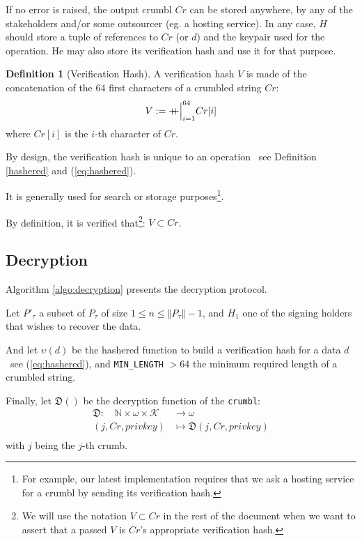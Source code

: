 \documentclass[twoside,twocolumn]{article}
\newcommand{\concat}{\mathbin{{+}\mspace{-8mu}{+}}}
\newcommand{\norm}[1]{\left\Vert#1\right\Vert}
\theoremstyle{definition}
\newtheorem{definition}{Definition}
\theoremstyle{remark}
\begin{document}
If no error is raised, the output crumbl $Cr$ can be stored anywhere, by any of the stakeholders and/or some outsourcer (eg. a hosting service). In any 
case, $H$ should store a tuple of references to $Cr$ (or $d$) and the keypair used for the operation. He may also store its verification hash and use 
it for that purpose.

\begin{definition}[Verification Hash]
    \label{verificationHash}
    A verification hash $V$ is made of the concatenation of the 64 first characters of a crumbled string $Cr$:
    \begin{equation}
        \label{eq:verificationHash}
        V := \concat {\Big|}_{i=1}^{64} Cr[i]
    \end{equation}
    where $Cr[i]$ is the $i$-th character of $Cr$.

    By design, the verification hash is unique to an operation \textemdash~see Definition \ref{hashered} and (\ref{eq:hashered}).

    It is generally used for search or storage purposes\footnote{For example, our latest implementation requires that we ask a hosting service for a 
    crumbl by sending its verification hash.}.

    By definition, it is verified that\footnote{We will use the notation $V \subset Cr$ in the rest of the document when we want to assert that a 
    passed $V$ is $Cr$'s appropriate verification hash.}: $V \subset Cr$.
\end{definition}

\subsection{Decryption}

Algorithm \ref{algo:decryption} presents the decryption protocol.

\vspace{1em} %

Let $P'_\tau$ a subset of $P_\tau$ of size $1 \leq n \leq \norm{P_\tau} - 1$, and $H_1$ one of the signing holders that wishes to recover the data.

And let $\upsilon(d)$ be the hashered function to build a verification hash for a data $d$ \textemdash~see (\ref{eq:hashered}), and 
\texttt{MIN\_LENGTH} $ > 64$ the minimum required length of a crumbled string.

Finally, let $\mathfrak{D}()$ be the decryption function of the \texttt{crumbl}:
\begin{equation}
    \label{eq:decrypt}
    \begin{array}{rl}
        \mathfrak{D}: \quad \mathbb{N} \times \omega \times \mathcal{K} &\to \omega \\
                (j, Cr, privkey) &\mapsto \mathfrak{D}(j, Cr, privkey) \\
    \end{array}
\end{equation}
with $j$ being the $j$-th crumb.
\end{document}
